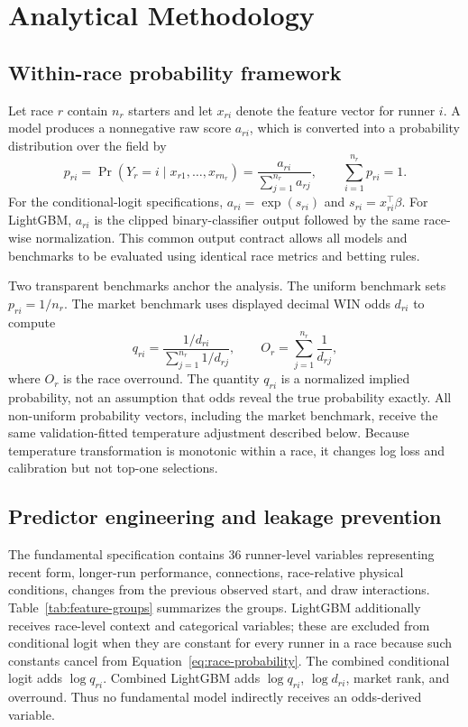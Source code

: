 \section{Analytical Methodology}\label{sec:methods}

\subsection{Within-race probability framework}\label{sec:methods-probability}
Let race $r$ contain $n_r$ starters and let $x_{ri}$ denote the feature vector for runner $i$. A model produces a nonnegative raw score $a_{ri}$, which is converted into a probability distribution over the field by
\begin{equation}
p_{ri}=\Pr(Y_r=i\mid x_{r1},\ldots,x_{rn_r})
=\frac{a_{ri}}{\sum_{j=1}^{n_r}a_{rj}},
\qquad \sum_{i=1}^{n_r}p_{ri}=1.
\label{eq:race-probability}
\end{equation}
For the conditional-logit specifications, $a_{ri}=\exp(s_{ri})$ and $s_{ri}=x_{ri}^{\top}\beta$. For LightGBM, $a_{ri}$ is the clipped binary-classifier output followed by the same race-wise normalization. This common output contract allows all models and benchmarks to be evaluated using identical race metrics and betting rules.

Two transparent benchmarks anchor the analysis. The uniform benchmark sets $p_{ri}=1/n_r$. The market benchmark uses displayed decimal WIN odds $d_{ri}$ to compute
\begin{equation}
q_{ri}=\frac{1/d_{ri}}{\sum_{j=1}^{n_r}1/d_{rj}},
\qquad
O_r=\sum_{j=1}^{n_r}\frac{1}{d_{rj}},
\label{eq:market-probability}
\end{equation}
where $O_r$ is the race overround. The quantity $q_{ri}$ is a normalized implied probability, not an assumption that odds reveal the true probability exactly. All non-uniform probability vectors, including the market benchmark, receive the same validation-fitted temperature adjustment described below. Because temperature transformation is monotonic within a race, it changes log loss and calibration but not top-one selections.

\subsection{Predictor engineering and leakage prevention}\label{sec:methods-features}
The fundamental specification contains 36 runner-level variables representing recent form, longer-run performance, connections, race-relative physical conditions, changes from the previous observed start, and draw interactions. Table~\ref{tab:feature-groups} summarizes the groups. LightGBM additionally receives race-level context and categorical variables; these are excluded from conditional logit when they are constant for every runner in a race because such constants cancel from Equation~\eqref{eq:race-probability}. The combined conditional logit adds $\log q_{ri}$. Combined LightGBM adds $\log q_{ri}$, $\log d_{ri}$, market rank, and overround. Thus no fundamental model indirectly receives an odds-derived variable.

